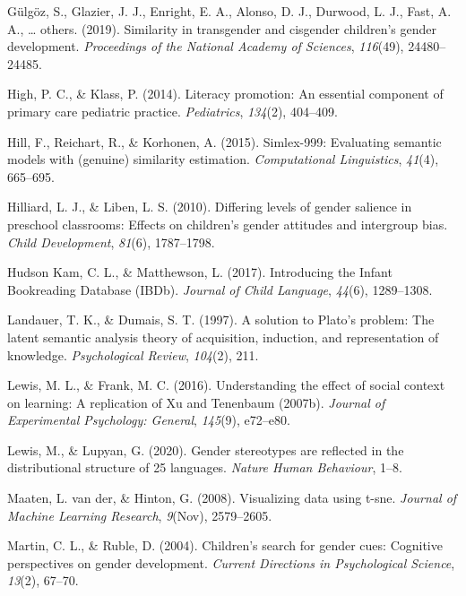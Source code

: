\documentclass[
  english,
  ,man,floatsintext]{apa6}
\begin{document}
\leavevmode\hypertarget{ref-gulgoz2019similarity}{}%
Gülgöz, S., Glazier, J. J., Enright, E. A., Alonso, D. J., Durwood, L. J., Fast, A. A., \ldots{} others. (2019). Similarity in transgender and cisgender children's gender development. \emph{Proceedings of the National Academy of Sciences}, \emph{116}(49), 24480--24485.

\leavevmode\hypertarget{ref-high2014literacy}{}%
High, P. C., \& Klass, P. (2014). Literacy promotion: An essential component of primary care pediatric practice. \emph{Pediatrics}, \emph{134}(2), 404--409.

\leavevmode\hypertarget{ref-hill2015simlex}{}%
Hill, F., Reichart, R., \& Korhonen, A. (2015). Simlex-999: Evaluating semantic models with (genuine) similarity estimation. \emph{Computational Linguistics}, \emph{41}(4), 665--695.

\leavevmode\hypertarget{ref-hilliard2010differing}{}%
Hilliard, L. J., \& Liben, L. S. (2010). Differing levels of gender salience in preschool classrooms: Effects on children's gender attitudes and intergroup bias. \emph{Child Development}, \emph{81}(6), 1787--1798.

\leavevmode\hypertarget{ref-kam_2017}{}%
Hudson Kam, C. L., \& Matthewson, L. (2017). Introducing the Infant Bookreading Database (IBDb). \emph{Journal of Child Language}, \emph{44}(6), 1289--1308.

\leavevmode\hypertarget{ref-landauer1997solution}{}%
Landauer, T. K., \& Dumais, S. T. (1997). A solution to Plato's problem: The latent semantic analysis theory of acquisition, induction, and representation of knowledge. \emph{Psychological Review}, \emph{104}(2), 211.

\leavevmode\hypertarget{ref-lewis2016understanding}{}%
Lewis, M. L., \& Frank, M. C. (2016). Understanding the effect of social context on learning: A replication of Xu and Tenenbaum (2007b). \emph{Journal of Experimental Psychology: General}, \emph{145}(9), e72--e80.

\leavevmode\hypertarget{ref-lewis2020}{}%
Lewis, M., \& Lupyan, G. (2020). Gender stereotypes are reflected in the distributional structure of 25 languages. \emph{Nature Human Behaviour}, 1--8.

\leavevmode\hypertarget{ref-maaten2008visualizing}{}%
Maaten, L. van der, \& Hinton, G. (2008). Visualizing data using t-sne. \emph{Journal of Machine Learning Research}, \emph{9}(Nov), 2579--2605.

\leavevmode\hypertarget{ref-martin2004children}{}%
Martin, C. L., \& Ruble, D. (2004). Children's search for gender cues: Cognitive perspectives on gender development. \emph{Current Directions in Psychological Science}, \emph{13}(2), 67--70.
\end{document}
